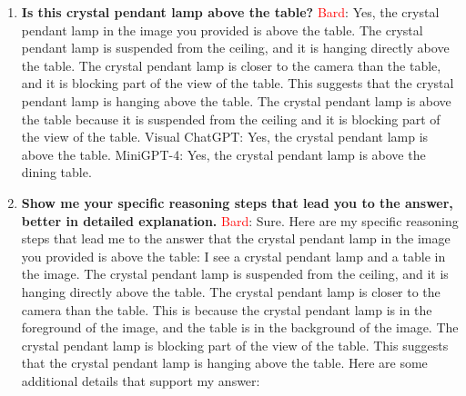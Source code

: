 \begin{enumerate}
    Do you have other questions or requests?
    \subitem Visual ChatGPT: The crystal pendant lamp is hanging above the table.
    \subitem MiniGPT-4: The crystal pendant lamp is hanging from the ceiling above the dining table. The table is made of wood and has six chairs around it. The room has white walls and a white floor. There is a window on the wall to the left of the table.
    \item \textbf{Is this crystal pendant lamp above the table?}
    \subitem \textcolor{Red}{Bard}: Yes, the crystal pendant lamp in the image you provided is above the table. The crystal pendant lamp is suspended from the ceiling, and it is hanging directly above the table. The crystal pendant lamp is closer to the camera than the table, and it is blocking part of the view of the table. This suggests that the crystal pendant lamp is hanging above the table. The crystal pendant lamp is above the table because it is suspended from the ceiling and it is blocking part of the view of the table.
    \subitem Visual ChatGPT: Yes, the crystal pendant lamp is above the table.
    \subitem MiniGPT-4: Yes, the crystal pendant lamp is above the dining table.
    \item \textbf{Show me your specific reasoning steps that lead you to the answer, better in detailed explanation.}
    \subitem \textcolor{Red}{Bard}: 
    Sure. Here are my specific reasoning steps that lead me to the answer that the crystal pendant lamp in the image you provided is above the table:
    I see a crystal pendant lamp and a table in the image.
    The crystal pendant lamp is suspended from the ceiling, and it is hanging directly above the table.
    The crystal pendant lamp is closer to the camera than the table. This is because the crystal pendant lamp is in the foreground of the image, and the table is in the background of the image.
    The crystal pendant lamp is blocking part of the view of the table. This suggests that the crystal pendant lamp is hanging above the table.
    Here are some additional details that support my answer:


\end{enumerate}
